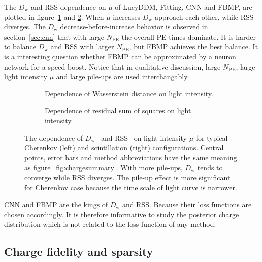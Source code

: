 
The $D_\mathrm{w}$ and RSS dependence on $\mu$ of LucyDDM, Fitting, CNN and FBMP, are plotted in figure~\ref{fig:wdistsummary} and \ref{fig:rsssummary}.  When $\mu$ increases $D_\mathrm{w}$ approach each other, while RSS diverges.  The $D_\mathrm{w}$ decrease-before-increase behavior is observed in section~\ref{sec:cnn} that with large $N_\mathrm{PE}$ the overall PE times dominate.  It is harder to balance $D_\mathrm{w}$ and RSS with larger $N_\mathrm{PE}$, but FBMP achieves the best balance.  It is a interesting question whether FBMP can be approximated by a neuron network for a speed boost.  Notice that in qualitative discussion, large $N_\mathrm{PE}$, large light intensity $\mu$ and large pile-ups are used interchangably.
\begin{figure}[H]
  \begin{subfigure}[b]{\textwidth}
    \resizebox{\textwidth}{!}{}
    \caption{\label{fig:wdistsummary}Dependence of Wasserstein distance on light intensity.}
  \end{subfigure}

  \vspace{0.5em}
  \begin{subfigure}[b]{\textwidth}
    \resizebox{\textwidth}{!}{}
    \caption{\label{fig:rsssummary}Dependence of residual sum of squares on light intensity.}
  \end{subfigure}
  \caption{\label{fig:summary}The dependence of $D_\mathrm{w}$~ and RSS~ on light intensity $\mu$ for typical Cherenkov (left) and scintillation (right) configurations.  Central points, error bars and method abbreviations have the same meaning as figure~\ref{fig:chargesummary}.  With more pile-ups, $D_\mathrm{w}$ tends to converge while RSS diverges.  The pile-up effect is more significant for Cherenkov case because the time scale of light curve is narrower. }
\end{figure}

CNN and FBMP are the kings of $D_\mathrm{w}$ and RSS.  Because their loss functions are chosen accordingly.  It is therefore informative to study the posterior charge distribution which is not related to the loss function of any method.

\subsection{Charge fidelity and sparsity}

